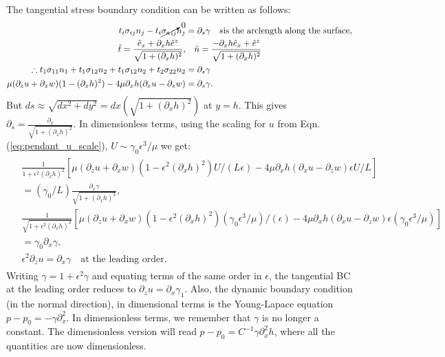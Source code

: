\documentclass{article}
\begin{document}
The tangential stress boundary condition can be written as follows:
\begin{align}\label{eq:tangential_stress_bc}
 \begin{split}
  t_{i}\sigma_{ij}n_{j} - t_{i}\cancelto{0}{{\sigma_{a}}_{ij}}n_{j} &= \partial_{s}\gamma \quad s\textrm{is the arclength along the surface},\\
  \hat{t} = \frac{\hat{e}_{x} + \partial_{x}h\hat{e}^{z}}{\sqrt{1+ (\partial_{x}h)^{2}}}, & \quad \hat{n} = \frac{-\partial_{x}h\hat{e}_{x} + \hat{e}^{z}}{\sqrt{1+ (\partial_{x}h)^{2}}}\\
  \therefore t_{1}\sigma_{11}n_{1} + t_{1}\sigma_{12}n_{2} + t_{1}\sigma_{12}n_{2} + t_{2}\sigma_{22}n_{2} &= \partial_{s}\gamma\\  
  \mu(\partial_{z}u + \partial_{x}w)(1 - (\partial_{x}h)^{2}) - 4\mu \partial_{x}h(\partial_{x}u - \partial_{z}w) &= \partial_{s}\gamma.
 \end{split}
\end{align}
But $ds \approx \sqrt{dx^{2} + dy^{2}} = dx (\sqrt{1 + (\partial_{x}h)^{2}})$ at $y=h$.
This gives $\partial_{s} = \frac{\partial_{x}}{\sqrt{1 + (\partial_{x}h)^{2}} }$.
In dimensionless terms, using the scaling for $u$ from Eqn. (\ref{eq:pendant_u_scale}), $U \sim \gamma_{0} \epsilon^{3}/\mu$ we get:
%
\begin{align}\label{eq:marangoni_tangential_stress_bc}
\begin{split}
& \frac{1}{1 + \epsilon^{2}(\partial_{x}h)^{2}}\left[\mu (\partial_{z}u + \partial_{x}w)(1 - \epsilon^{2}(\partial_{x}h)^{2}) U/(L\epsilon) - 4\mu \partial_{x}h(\partial_{x}u - \partial_{z} w) \epsilon U/L \right]\\
%
&= (\gamma_{0}/L) \frac{\partial_{x}\gamma}{\sqrt{1 + (\partial_{x}h)^{2}}},\\
%
& \frac{1}{\sqrt{1 + \epsilon^{2}(\partial_{x}h)^{2}}}\left[\mu (\partial_{z}u + \partial_{x}w)(1 - \epsilon^{2}(\partial_{x}h)^{2}) (\gamma_{0} \epsilon^{3}/\mu)/(\epsilon) - 4\mu \partial_{x}h(\partial_{x}u - \partial_{z} w) \epsilon (\gamma_{0} \epsilon^{3}/\mu) \right]\\
%
&= \gamma_{0} \partial_{x}\gamma,\\
%
& \boxed{\epsilon^{2} \partial_{z} u = \partial_{x}\gamma } \quad \textrm{at the leading order}.
\end{split}
\end{align}
Writing $\gamma = 1 + \epsilon^{2}\gamma$ and equating terms of the same order in $\epsilon$, the tangential BC at the leading order reduces to $\boxed{\partial_{z}u = \partial_{x}\gamma_{1}}$. 
Also, the dynamic boundary condition (in the normal direction), in dimensional terms is the Young-Lapace equation $p-p_{0} = -\gamma \partial^{2}_{x}$. In dimensionless terms, we remember that $\gamma$ is no longer a constant. The dimensionless version will read $p - p_{0} = C^{-1}\gamma \partial_{x}^{2}h$, where all the quantities are now dimensionless. 
\end{document}

